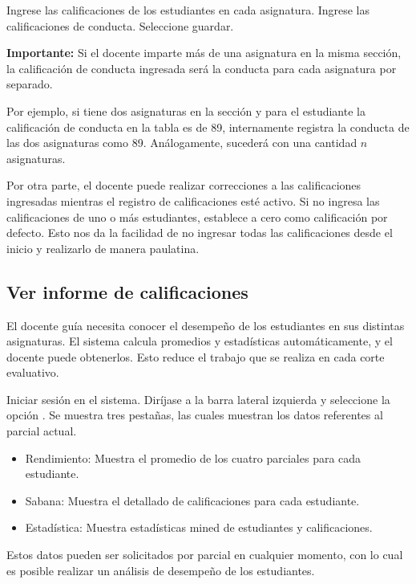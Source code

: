 \documentclass[12pt]{article}
\begin{document}
     Ingrese las calificaciones de los estudiantes en cada asignatura.
     Ingrese las calificaciones de conducta.
     Seleccione guardar.

    \textbf{Importante:} Si el docente imparte más de una asignatura en la misma sección, la calificación de conducta ingresada
    será la conducta para cada asignatura por separado.

    Por ejemplo, si tiene dos asignaturas en la sección y para el estudiante  la calificación
    de conducta en la tabla es de 89, \wsm internamente registra la conducta de las dos asignaturas como 89.
    Análogamente, sucederá con una cantidad $n$ asignaturas.

    Por otra parte, el docente puede realizar correcciones a las calificaciones ingresadas mientras el registro de
    calificaciones esté activo.
    Si no ingresa las calificaciones de uno o más estudiantes, \wsm establece a cero como calificación por defecto.
    Esto nos da la facilidad de no ingresar todas las calificaciones desde el inicio y realizarlo de manera paulatina.

    \subsection{Ver informe de calificaciones}

    El docente guía necesita conocer el desempeño de los estudiantes en sus distintas asignaturas.
    El sistema \wsm calcula promedios y estadísticas automáticamente, y el docente puede obtenerlos.
    Esto reduce el trabajo que se realiza en cada corte evaluativo.

    \stepTitle
     Iniciar sesión en el sistema.
     Diríjase a la barra lateral izquierda y seleccione la opción .
     Se muestra tres pestañas, las cuales muestran los datos referentes al parcial actual.
    \begin{itemize}
        \item Rendimiento: Muestra el promedio de los cuatro parciales para cada estudiante.
        \item Sabana: Muestra el detallado de calificaciones para cada estudiante.
        \item Estadística: Muestra estadísticas mined de estudiantes y calificaciones.
    \end{itemize}

    Estos datos pueden ser solicitados por parcial en cualquier momento, con lo cual es posible realizar un análisis
    de desempeño de los estudiantes.
\end{document}
